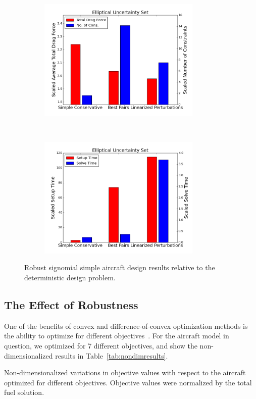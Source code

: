 \begin{figure}[ht]
\begin{subfigure}{0.499\textwidth}
        \includegraphics[height=2.3in]{signomial_simple_flight/ell.png}
    \end{subfigure}%
    ~ 
    \begin{subfigure}{0.49\textwidth}
        \centering
        \includegraphics[height=2.3in]{signomial_simple_flight/ell_times.png}
    \end{subfigure}
    \caption{Robust signomial simple aircraft design results relative to the deterministic design problem.}
    \label{compare_signomial}
\end{figure}

\subsection{The Effect of Robustness}

One of the benefits of convex and difference-of-convex optimization methods is the ability to optimize for
different objectives~\cite{York2018}. For the aircraft model in question, we optimized for 7 different objectives, and show
the non-dimensionalized results in Table~\ref{tab:nondimresults}.

\begin{table}
\caption{Non-dimensionalized variations in objective values with respect to the aircraft optimized
for different objectives. Objective values were normalized by the total fuel solution.}
    \label{tab:nondimresults}
\end{table}

